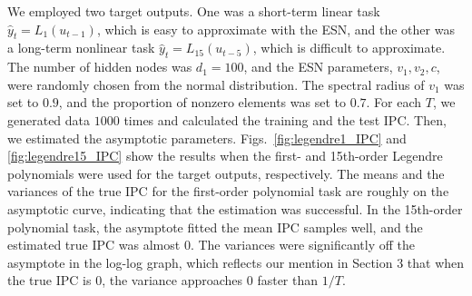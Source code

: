 \documentclass{article}
\begin{document}
We employed two target outputs. 
One was a short-term linear task $\hat{y}_t = L_1(u_{t-1})$, which is easy to approximate with the ESN, and the other was a long-term nonlinear task $\hat{y}_t = L_{15}(u_{t-5})$, which is difficult to approximate. 
The number of hidden nodes was $d_1 = 100$, and the ESN parameters, $v_1, v_2, c$, were randomly chosen from the normal distribution. 
The spectral radius of $v_1$ was set to $0.9$, and the proportion of nonzero elements was set to $0.7$. 
For each $T$, we generated data $1000$ times and calculated the training and the test IPC. 
Then, we estimated the asymptotic parameters. 
Figs.~\ref{fig:legendre1_IPC} and \ref{fig:legendre15_IPC} show the results when the first- and 15th-order Legendre polynomials were used for the target outputs, respectively. 
The means and the variances of the true IPC for the first-order polynomial task are roughly on the asymptotic curve, indicating that the estimation was successful. 
In the 15th-order polynomial task, the asymptote fitted the mean IPC samples well, and the estimated true IPC was almost $0$. 
The variances were significantly off the asymptote in the log-log graph, which reflects our mention in Section 3 that when the true IPC is $0$, the variance approaches $0$ faster than $1/T$. 


\begin{comment}
RC は隠れノード関数の線形和で関数を近似するため、RC がどのような関数を近似できるかは、$L^2({\cal U}, \mu)$ の各直交多項式の IPC を計算することで評価できる\cite{dambre2012information, kubota2021unifying}。
入力列 $U'$ を ${\rm Uniform}(-1, 1)$ から独立にサンプルし、出力をルジャンドル多項式の積
\begin{align}
\hat{y}(U'_t) = \prod_{i=1}^\infty L_{s_i}(u_{t-i}),
\end{align}
とする。ここで、$L_{s_i}$ は $s_i$ 次ルジャンドル多項式であり、$\{s_i\}_{i=1}^\infty$ のうち $0$ でない要素は有限個とする。
ここでは教師信号として、ESN で近似が容易な短時間の線形タスク $y_t = L_1(u_{t-1})$ と、近似が難しい長時間の非線形タスク $y_t = L_{15}(u_{t-5})$ を使用する。
隠れノード数は $d_1 = 100$ とし、ESN パラメータ $v_1, v_2, c$ は正規分布を用いてランダムにとった。
特に $v_1$ はスペクトル半径を $0.9$ とし、$0$ でない要素の割合は $0.7$ とした。
各 $T$ で $1000$ 回データを生成し、訓練 IPC とテスト IPC の計算を行った。
続いてそれらの平均値と分散から最小二乗法で漸近形のパラメータ推定をした。
教師出力にルジャンドル1次式を用いたものは図\ref{fig:legendre1_IPC}, ルジャンドル15次式を用いたものは図\ref{fig:legendre15_IPC}となった。
1次式のほうは平均値、分散ともに推定した曲線状に概ね乗っており、推定がうまく行えていることが分かる。
15次式のほうは平均値のフィッティングはうまく行えたが、真の IPC の推定値がほぼ $0$ となっており、そのため分散の結果は両対数グラフで大きくずれていることが分かる。
3節で指摘したように、真の IPC が $0$ のときは分散は $1/T$ より速く $0$ に近づくことが分かる。
\end{comment}
\end{document}
